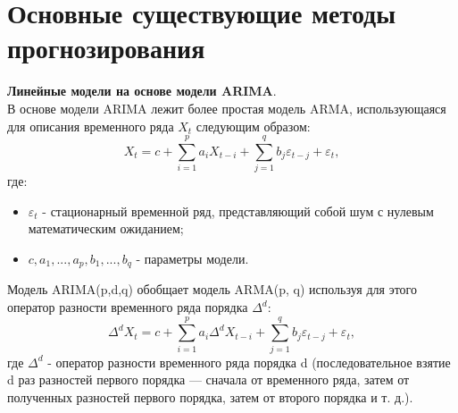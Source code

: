 \documentclass[11pt]{article}
\begin{document}
\section*{Основные существующие методы прогнозирования}
\textbf{Линейные модели на основе модели ARIMA}.
\\
В основе модели ARIMA лежит более простая модель ARMA, использующаяся для описания временного ряда $X_t$ следующим образом:
$$X_t = c + \sum_{i=1}^{p}{a_iX_{t-i}} + \sum_{j=1}^{q}{b_j\varepsilon_{t-j} + \varepsilon_t},$$
где:
\begin{itemize}
\item $\varepsilon_t$ - стационарный временной ряд, представляющий собой шум с нулевым математическим ожиданием;
\item $ c, a_1, ..., a_p, b_1, ..., b_q $ - параметры модели.
\end{itemize}
Модель ARIMA(p,d,q) обобщает модель ARMA(p, q) используя для этого оператор разности временного ряда порядка $\Delta^d$:
$$\Delta^dX_t = c + \sum_{i=1}^{p}{a_i\Delta^dX_{t-i}} + \sum_{j=1}^{q}{b_j\varepsilon_{t-j} + \varepsilon_t},$$
где $\Delta^d$ - оператор разности временного ряда порядка d (последовательное взятие d раз разностей первого порядка — сначала от временного ряда, затем от полученных разностей первого порядка, затем от второго порядка и т. д.).
\end{document}
